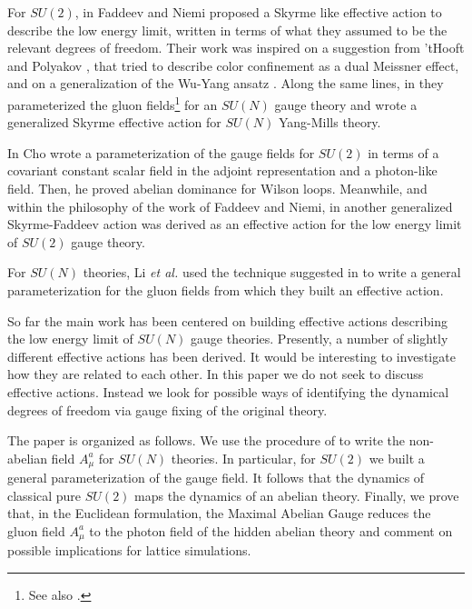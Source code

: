 \documentclass[a4paper,a4paper]{article}
\begin{document}
For $SU(2)$, in \cite{FaNi98} Faddeev and Niemi proposed a Skyrme like 
effective action to describe the low energy limit, written in terms of what 
they assumed to be the relevant degrees of freedom. 
Their work was inspired on a suggestion from 'tHooft and Polyakov 
\cite{tHPo,Poly}, 
that tried to describe color confinement as a dual Meissner effect, and on a 
generalization of the Wu-Yang ansatz \cite{WuYa}. Along the same lines,
in \cite{FaNi98a} they parameterized the gluon 
fields\footnote{See also \cite{FaNi99}.} for an $SU(N)$ gauge theory and wrote
a generalized Skyrme effective action for $SU(N)$ Yang-Mills theory. 

In \cite{Cho99,Cho80} Cho wrote a parameterization of the 
gauge fields for $SU(2)$ in terms of a covariant constant scalar field in the 
adjoint representation and a photon-like field. Then, he proved 
abelian dominance for Wilson loops.
Meanwhile, and within the philosophy of the work of Faddeev and Niemi, 
in \cite{ChoLeePak} another generalized Skyrme-Faddeev action was derived as 
an effective action for the low energy limit of $SU(2)$ gauge theory.

For $SU(N)$ theories, Li \textit{et al.} \cite{Li99} used the technique
suggested in \cite{Cho99} to write a general parameterization for the gluon 
fields from which they built an effective action.

So far the main work has been centered on building effective actions 
describing the low energy limit of $SU(N)$ gauge theories. Presently, a
number of slightly different effective actions has been derived. It would
be interesting to investigate how they are related to each other. In this 
paper we do not seek to discuss effective actions. Instead we 
look for possible ways of identifying the dynamical degrees of freedom via 
gauge fixing of the original theory.

The paper is organized as follows. We use the procedure of
\cite{Cho99} to write the non-abelian field $A^a_\mu$ for $SU(N)$ theories. 
In particular, for $SU(2)$ we built a general parameterization of the gauge 
field. It follows that the dynamics of classical pure $SU(2)$ maps the
dynamics of an abelian theory. Finally, we prove that, in the Euclidean 
formulation, the Maximal Abelian Gauge reduces the gluon field $A^a_\mu$ to
the photon field of the hidden abelian theory and comment on possible 
implications for lattice simulations.


\end{document}
